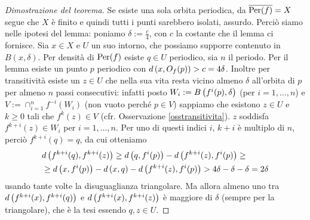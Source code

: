\begin{proof}[Dimostrazione del teorema]Se esiste una sola orbita periodica,
da $\overline{\operatorname{Per}(f)}=X$ segue che $X$ è finito e quindi tutti i punti sarebbero isolati, assurdo.\newline
Perciò siamo nelle ipotesi del lemma: poniamo $\delta:=\frac{c}{4}$, con $c$ la costante che il lemma ci fornisce.
Sia $x\in X$ e $U$ un suo intorno, che possiamo supporre contenuto in $B(x,\delta)$. Per densità di $\operatorname{Per}(f)$ esiste $q\in U$ periodico,
sia $n$ il periodo. Per il lemma esiste un punto $p$ periodico con $d\left(x,O_f(p)\right)>c=4\delta$. Inoltre per transitività
esiste un $z\in U$ che nella sua vita resta vicino almeno $\delta$ all'orbita di $p$ per almeno $n$ passi consecutivi:
infatti posto $W_i:=B\left(f^i(p),\delta\right)$ (per $i=1,\dots,n$) e $V:=\cap_{i=1}^n f^{-i}(W_i)$ (non vuoto perché $p\in V$)
sappiamo che esistono $z\in U$ e $k\ge 0$ tali che $f^k(z)\in V$ (cfr. Osservazione \ref{osstransitivita}). $z$ soddisfa
$f^{k+i}(z)\in W_i$ per $i=1,\dots,n$. Per uno di questi indici $i$, $k+i$ è multiplo di $n$,
perciò $f^{k+i}(q)=q$, da cui otteniamo
\[ \begin{split} &d\left(f^{k+i}(q),f^{k+i}(z)\right)\ge d\left(q,f^i(p)\right)-d\left(f^{k+i}(z),f^i(p)\right)\ge \\
&\ge d\left(x,f^i(p)\right)-d\left(x,q\right)-d\left(f^{k+i}(z),f^i(p)\right)>4\delta-\delta-\delta=2\delta \end{split} \]
usando tante volte la disuguaglianza triangolare. Ma allora almeno uno tra
$d\left(f^{k+i}(x),f^{k+i}(q)\right)$ e $d\left(f^{k+i}(x),f^{k+i}(z)\right)$ è maggiore di $\delta$ (sempre per la triangolare), che è la tesi
essendo $q,z\in U$.
\end{proof}



